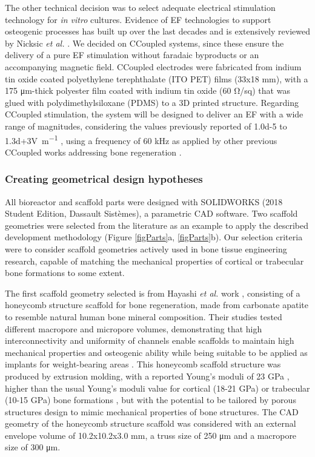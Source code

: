 The other technical decision was to select adequate electrical stimulation technology for \textit{in vitro} cultures. Evidence of \acs{EF} technologies to support osteogenic processes has built up over the last decades and is extensively reviewed by Nicksic \textit{et al.} \cite{Nicksic2022-jy}. We decided on \acs{CCoupled} systems, since these ensure the delivery of a pure \acs{EF} stimulation without faradaic byproducts or an accompanying magnetic field. \acs{CCoupled} electrodes were fabricated from indium tin oxide coated polyethylene terephthalate (ITO PET) films (33x18 \unit{\milli\meter}), with a 175 \unit{\micro\meter}-thick polyester film coated with indium tin oxide (60 \unit{\ohm}/sq) that was glued with polydimethylsiloxane (PDMS) to a 3D printed structure. Regarding \acs{CCoupled} stimulation, the system will be designed to deliver an \acs{EF} with a wide range of magnitudes, considering the values previously reported of \num{1.0d-5} to \num{1.3d+3}\unit{\volt\per\meter} \cite{Fitzsimmons1986-ks, Korenstein1984-qb}, using a frequency of 60 \unit{\kilo\hertz} as applied by other previous \acs{CCoupled} works addressing bone regeneration \cite{Brighton1992-gg, Stephan2020-qh}.


\subsubsection{Creating geometrical design hypotheses}
All bioreactor and scaffold parts were designed with SOLIDWORKS (2018 Student Edition, Dassault Sistèmes), a parametric \acs{CAD} software. Two scaffold geometries were selected from the literature as an example to apply the described development methodology (Figure \ref{figParts}a, \ref{figParts}b). Our selection criteria were to consider scaffold geometries actively used in bone tissue engineering research, capable of matching the mechanical properties of cortical or trabecular bone formations to some extent. 

The first scaffold geometry selected is from Hayashi \textit{et al.} work \cite{Hayashi2019-qx, Hayashi2020-fr, Hayashi2022-oa, Shibahara2022-kj}, consisting of a honeycomb structure scaffold for bone regeneration, made from carbonate apatite to resemble natural human bone mineral composition. Their studies tested different macropore and micropore volumes, demonstrating that high interconnectivity and uniformity of channels enable scaffolds to maintain high mechanical properties and osteogenic ability while being suitable to be applied as implants for weight-bearing areas \cite{Hayashi2019-qx, Hayashi2020-fr}. This honeycomb scaffold structure was produced by extrusion molding, with a reported Young’s moduli of 23 \unit{\giga\pascal} \cite{Hayashi2020-fr}, higher than the usual Young’s moduli value for cortical (18-21 \unit{\giga\pascal}) or trabecular (10-15 \unit{\giga\pascal}) bone formations \cite{Morgan2018-pv}, but with the potential to be tailored by porous structures design to mimic mechanical properties of bone structures. The \acs{CAD} geometry of the honeycomb structure scaffold was considered with an external envelope volume of 10.2x10.2x3.0 \unit{\milli\meter}, a truss size of 250 \unit{\micro\meter} and a macropore size of 300 \unit{\micro\meter}. 

